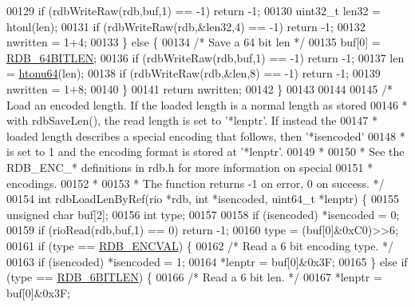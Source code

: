 \begin{DoxyCode}
{{{00129         \textcolor{keywordflow}{if} (rdbWriteRaw(rdb,buf,1) == -1) \textcolor{keywordflow}{return} -1;
00130         uint32\_t len32 = htonl(len);
00131         \textcolor{keywordflow}{if} (rdbWriteRaw(rdb,&len32,4) == -1) \textcolor{keywordflow}{return} -1;
00132         nwritten = 1+4;
00133     \} \textcolor{keywordflow}{else} \{
00134         \textcolor{comment}{/* Save a 64 bit len */}
00135         buf[0] = \hyperlink{rdb_8h_abb426bfb742c8661924175b285d1f55f}{RDB\_64BITLEN};
00136         \textcolor{keywordflow}{if} (rdbWriteRaw(rdb,buf,1) == -1) \textcolor{keywordflow}{return} -1;
00137         len = \hyperlink{endianconv_8h_a41a6b64ba8dec362f605f615e528fcf3}{htonu64}(len);
00138         \textcolor{keywordflow}{if} (rdbWriteRaw(rdb,&len,8) == -1) \textcolor{keywordflow}{return} -1;
00139         nwritten = 1+8;
00140     \}
00141     \textcolor{keywordflow}{return} nwritten;
00142 \}
00143 
00144 
00145 \textcolor{comment}{/* Load an encoded length. If the loaded length is a normal length as stored}
00146 \textcolor{comment}{ * with rdbSaveLen(), the read length is set to '*lenptr'. If instead the}
00147 \textcolor{comment}{ * loaded length describes a special encoding that follows, then '*isencoded'}
00148 \textcolor{comment}{ * is set to 1 and the encoding format is stored at '*lenptr'.}
00149 \textcolor{comment}{ *}
00150 \textcolor{comment}{ * See the RDB\_ENC\_* definitions in rdb.h for more information on special}
00151 \textcolor{comment}{ * encodings.}
00152 \textcolor{comment}{ *}
00153 \textcolor{comment}{ * The function returns -1 on error, 0 on success. */}
00154 \textcolor{keywordtype}{int} rdbLoadLenByRef(rio *rdb, \textcolor{keywordtype}{int} *isencoded, uint64\_t *lenptr) \{
00155     \textcolor{keywordtype}{unsigned} \textcolor{keywordtype}{char} buf[2];
00156     \textcolor{keywordtype}{int} type;
00157 
00158     \textcolor{keywordflow}{if} (isencoded) *isencoded = 0;
00159     \textcolor{keywordflow}{if} (rioRead(rdb,buf,1) == 0) \textcolor{keywordflow}{return} -1;
00160     type = (buf[0]&0xC0)>>6;
00161     \textcolor{keywordflow}{if} (type == \hyperlink{rdb_8h_a060ed4ae9ab0a1306508189d4c1b2e11}{RDB\_ENCVAL}) \{
00162         \textcolor{comment}{/* Read a 6 bit encoding type. */}
00163         \textcolor{keywordflow}{if} (isencoded) *isencoded = 1;
00164         *lenptr = buf[0]&0x3F;
00165     \} \textcolor{keywordflow}{else} \textcolor{keywordflow}{if} (type == \hyperlink{rdb_8h_a11b7223b73ffc4e85093a19703362c5e}{RDB\_6BITLEN}) \{
00166         \textcolor{comment}{/* Read a 6 bit len. */}
00167         *lenptr = buf[0]&0x3F;
}}}
\end{DoxyCode}
